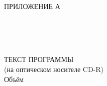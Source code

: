 \begin{ESKDtitlePage}
  \begin{flushright}
    ПРИЛОЖЕНИЕ А \enspace
  \end{flushright}
  
  \begin{center}
    \envDiplomEducation \\
    \envDiplomUniversity \\
    \envDiplomCathedra \\
  \end{center}

  \vfill

  \begin{center}
    ТЕКСТ ПРОГРАММЫ \\
    (на оптическом носителе CD-R) \\
    Объём~\envDiplomDiskSize \\
  \end{center}

  \vfill

  \begin{center}
    \envCode \\
  \end{center}

  \vfill

  

  \vfill

  \begin{center}
    \ESKDtheYear
  \end{center}
\end{ESKDtitlePage}
